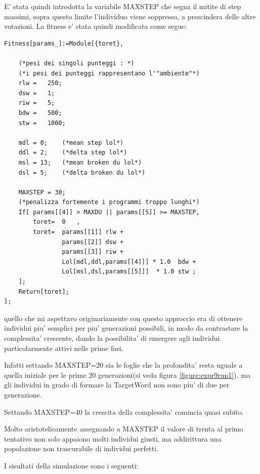 \documentclass[12pt, a4paper]{article}
\begin{document}
E' stata quindi introdotta la variabile MAXSTEP che segna il mitite di step massimi, sopra questo limite l'individuo viene soppresso, a prescindera delle altre votazioni.
La fitness e' stata quindi modificata come segue:
\begin{lstlisting}
Fitness[params_]:=Module[{toret},

	(*pesi dei singoli punteggi : *)
	(*i pesi dei punteggi rappresentano l'"ambiente"*)
	rlw	=	250;
	dsw	=	1;
	riw	=	5;
	bdw	=	500;
	stw	=	1000;

	mdl = 0;	(*mean step lol*) 
	ddl = 2;	(*delta step lol*) 
	msl = 13;	(*mean broken du lol*) 
	dsl = 5;	(*delta broken du lol*) 

	MAXSTEP = 30;
	(*penalizza fortemente i programmi troppo lunghi*) 
	If[	params[[4]] > MAXDU || params[[5]] >= MAXSTEP,
		toret=	0	,
		toret=	params[[1]] rlw + 
				params[[2]] dsw + 
				params[[3]] riw +
				Lol[mdl,ddl,params[[4]]] * 1.0  bdw + 
				Lol[msl,dsl,params[[5]]]  * 1.0 stw ;  
	];
	Return[toret];
];
\end{lstlisting}

quello che mi aspettavo originariamente con questo approccio era di ottenere individui piu' semplici per piu' generazioni possibili, in modo da contrastare la complessita' crescente, dando la possibilita' di emergere agli individui particolarmente attivi nelle prime fasi.

Infatti settando MAXSTEP=20 sia le foglie che la profondita' resta uguale a quella iniziale per le prime 20 generazioni(si veda figura \ref{figure:expr9run1}), ma gli individui in grado di formare la TargetWord non sono piu' di due per generazione.

Settando MAXSTEP=40 la crescita della complessita' comincia quasi subito.

Molto aristotelicamente assegnando a MAXSTEP il valore di trenta al primo tentativo non solo appaiono molti individui giusti, ma addirittura una popolazione non trascurabile di individui perfetti.

I sisultati della simulazione sono i seguenti:
\end{document}
